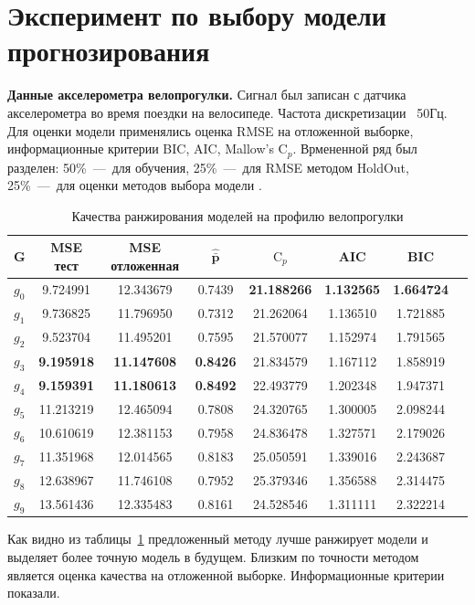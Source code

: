 \documentclass[article,14pt,subf,href,colorlinks=true
]{disser}
\begin{document}
\section{Эксперимент по выбору модели прогнозирования}
\textbf{Данные акселерометра велопрогулки.}
Сигнал был записан с датчика акселерометра во время поездки на велосипеде.
Частота дискретизации ~50Гц.
Для оценки модели применялись оценка RMSE на отложенной выборке, информационные критерии BIC, AIC, Mallow's $\text{C}_p$.  
Врмененной ряд был разделен: 50\%~---~для обучения, 25\%~---~для RMSE методом HoldOut, 25\%~---~для оценки методов выбора модели .
 
\renewcommand{\arraystretch}{1.25}
 
\begin{table}[H]
\caption{Качества ранжирования моделей на профилю велопрогулки}
\centering\medskip\tabcolsep=4pt

\label{tbl:rang_table_bike}
\begin{tabular}{l|ccccccc}
\hline
G &  MSE тест &  MSE отложенная & $\mathbf{\hat{\bar{p}}}$ & $\text{C}_p$ & AIC & BIC \\
\hline
$g_0$ &  9.724991 &  12.343679 &  0.7439 & \textbf{21.188266} & \textbf{1.132565} & \textbf{1.664724} \\
$g_1$ &  9.736825 &  11.796950 &  0.7312 & 21.262064 & 1.136510 & 1.721885 \\
$g_2$ &  9.523704 &  11.495201 &  0.7595 & 21.570077 & 1.152974 & 1.791565 \\
$g_3$ &  \textbf{9.195918} &  \textbf{11.147608} &  \textbf{0.8426} & 21.834579 & 1.167112 & 1.858919 \\
$g_4$ &  \textbf{9.159391} &  \textbf{11.180613} &  \textbf{0.8492} & 22.493779 & 1.202348 & 1.947371 \\
$g_5$ & 11.213219 &  12.465094 &  0.7808 & 24.320765 & 1.300005 & 2.098244 \\
$g_6$ & 10.610619 &  12.381153 &  0.7958 & 24.836478 & 1.327571 & 2.179026 \\
$g_7$ & 11.351968 &  12.014565 &  0.8183 & 25.050591 & 1.339016 & 2.243687 \\
$g_8$ & 12.638967 &  11.746108 &  0.7952 & 25.379346 & 1.356588 & 2.314475 \\
$g_9$ & 13.561436 &  12.335483 &  0.8161 & 24.528546 & 1.311111 & 2.322214 \\
\hline
\end{tabular}
\end{table}

Как видно из таблицы~\ref{tbl:rang_table_bike} предложенный методу лучше ранжирует модели и выделяет более точную модель в будущем.
Близким по точности методом является оценка качества на отложенной выборке.
Информационные критерии показали.
\end{document}
